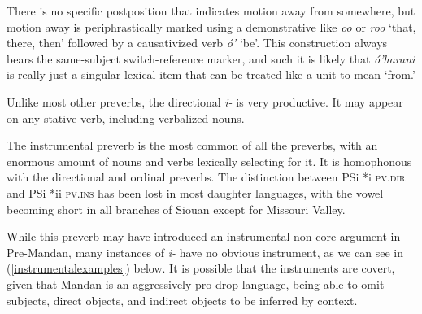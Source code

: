 There is no specific postposition that indicates motion away from somewhere, but motion away is periphrastically marked using a demonstrative like \textit{oo} or \textit{roo} `that, there, then' followed by a causativized verb \textit{ó'} `be'. This construction always bears the same-subject switch-reference marker, and such it is likely that \textit{ó'harani} is really just a singular lexical item that can be treated like a unit to mean `from.'

Unlike most other preverbs, the directional \textit{i-} is very productive. It may appear on any stative verb, including verbalized nouns. 

\label{SubParaInstrumental}

The instrumental preverb is the most common of all the preverbs, with an enormous amount of nouns and verbs lexically selecting for it. It is homophonous with the directional and ordinal preverbs. The distinction between PSi *i \textsc{pv.dir} and PSi *ii \textsc{pv.ins} has been lost in most daughter languages, with the vowel becoming short in all branches of Siouan except for Missouri Valley.

While this preverb may have introduced an instrumental non-core argument in Pre-Mandan, many instances of \textit{i-} have no obvious instrument, as we can see in (\ref{instrumentalexamples}) below. It is possible that the instruments are covert, given that Mandan is an aggressively {pro}-drop language, being able to omit subjects, direct objects, and indirect objects to be inferred by context.


